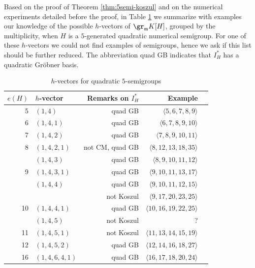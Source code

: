 \documentclass[12pt]{amsart}
\def\frk{\mathfrak}               %
\def\mm{{\frk m}}
\begin{document}
Based on the proof of Theorem \ref{thm:5semi-koszul} and on the numerical experiments detailed before the proof, 
in Table \ref{table:multiplicities} 
we summarize  with examples our knowledge of the possible $h$-vectors of $\gr_\mm K[H]$, 
grouped by the multiplicity, when $H$ is a $5$-generated quadratic numerical semigroup.
For one of these $h$-vectors we could not find examples of semigroups, 
hence we ask if this list should be further reduced. The abbreviation quad GB indicates that $I_H^*$ has a quadratic Gr\"obner basis.
 
\begin{table}[ht]
\caption{$h$-vectors for quadratic $5$-semigroups}
\centering
\begin{tabular}{r l r r r      } 
\hline \hline 
$e(H)$ & $h$-vector & Remarks on $I_H^*$    &  Example    \\[0.5ex]
\hline 
5 &  $(1,4)$  & quad GB   & $\langle 5,6,7,8,9 \rangle $ \\
\hline
6 &  $(1,4,1)$   & quad GB   & $\langle 6,7,8,9,10 \rangle $  \\
\hline 
7 &  $(1,4,2)$ & quad GB & $\langle 7,8,9,10,11 \rangle $    \\
\hline
8 &  $(1,4,2,1)$  & not CM, quad GB & $\langle  8,12,13,18,35 \rangle $    \\
\phantom{8} &  $(1,4,3)$  & quad GB    & $\langle  8,9,10,11,12 \rangle $      \\
\hline
9 &  $(1,4,3,1)$  & quad GB   &  $\langle  9, 10,11,13,17 \rangle $    \\
\phantom{9} &  $(1,4,4)$  & quad GB  & $\langle  9, 10, 11,12, 15 \rangle $       \\
\phantom{9} &  \phantom{$(1,4,4)$}    & not Koszul  & $\langle  9, 17, 20, 23, 25 \rangle $   \\
\hline
10 &  $(1,4,4,1)$  & quad GB & $\langle 10, 16, 19,22,25 \rangle$      \\
\phantom{10} &  $(1,4,5)$  & not Koszul  & ?      \\
\hline
11 & $(1,4,5,1)$  & not Koszul    & $\langle 11,13,14,15,19 \rangle$  \\
\hline 
12 & $(1,4,5,2)$ &  quad GB  & $\langle 12,14, 16,18,27\rangle$     \\
\hline 
16 & $(1,4,6,4,1)$ & quad GB   & $\langle 16, 17,18,20, 24\rangle$  \\
[1ex]
\hline
\end{tabular}
\label{table:multiplicities}
\end{table} 
 
\end{document}
